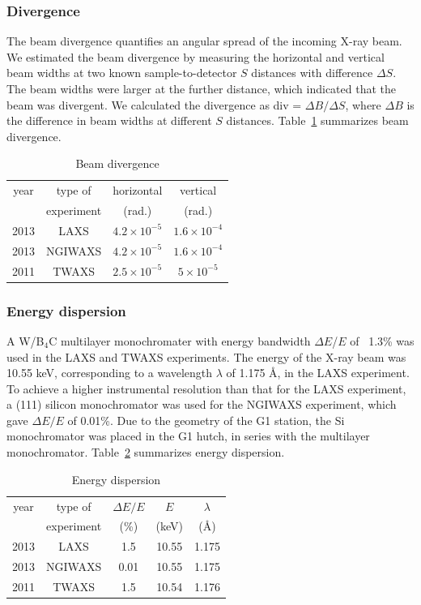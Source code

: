 \subsubsection{Divergence}
The beam divergence quantifies an angular spread of the incoming X-ray
beam. We estimated the beam divergence by measuring the horizontal and 
vertical beam widths at two known sample-to-detector $S$ distances
with difference $\Delta S$. 
The beam widths were larger at the further distance, which indicated 
that the beam was divergent. 
We calculated the divergence as div = $\Delta B/\Delta S$, where
$\Delta B$ is the difference in beam widths at different $S$ distances.
Table~\ref{tb:beam_divergence} summarizes beam divergence.

\begin{table}[htbp]
  \centering
  \begin{tabular}{cccc}
    \hline
    year & type of  & horizontal & vertical \\
     & experiment & (rad.) & (rad.) \\
    \hline
    2013 & LAXS & $4.2 \times 10^{-5}$ & $1.6 \times 10^{-4}$ \\
    2013 & NGIWAXS & $4.2 \times 10^{-5}$ & $1.6 \times 10^{-4}$ \\
    2011 & TWAXS & $2.5 \times 10^{-5}$ & $5 \times 10^{-5}$ \\
    \hline
  \end{tabular}
  \caption[Beam divergence]{Beam divergence}
  \label{tb:beam_divergence}
\end{table}

\subsubsection{Energy dispersion}
A W/B$_4$C multilayer monochromater with energy bandwidth $\Delta E$/$E$ of 
~1.3\% was used in the LAXS and TWAXS experiments. 
The energy of the X-ray beam was 10.55 keV, corresponding to a wavelength 
$\lambda$ of 1.175 \AA, in the LAXS experiment.
To achieve a higher instrumental resolution than that for 
the LAXS experiment, a (111) silicon monochromator was used for 
the NGIWAXS experiment, which gave $\Delta E/E$ of 0.01\%.
Due to the geometry of the G1 station, the Si monochromator was placed in
the G1 hutch, in series with the multilayer monochromator. 
Table~\ref{tb:energy_dispersion} summarizes energy dispersion.

\begin{table}[htbp]
  \centering
  \begin{tabular}{ccccc}
    \hline
    year & type of & $\Delta E/E$ & $E$ & $\lambda$ \\
     & experiment & (\%) & (keV) & (\AA) \\
    \hline
    2013 & LAXS & 1.5 & 10.55 & 1.175 \\
    2013 & NGIWAXS & 0.01 & 10.55 & 1.175 \\
    2011 & TWAXS & 1.5 & 10.54 & 1.176 \\
    \hline
  \end{tabular}
  \caption[Energy dispersion]{Energy dispersion}
  \label{tb:energy_dispersion}
\end{table}

